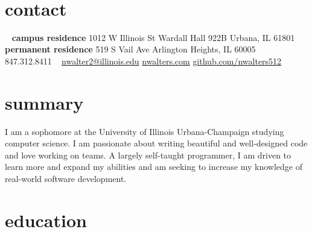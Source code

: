 \documentclass[nofooter]{resume}
\begin{document}


\begin{aside} %
~\vspace{-0.42cm} %
\section{contact}
\vspace{-0.16cm} %
~
\textbf{campus residence}
1012 W Illinois St
Wardall Hall 922B
Urbana, IL
61801
~
\textbf{permanent residence}
519 S Vail Ave
Arlington Heights, IL
60005
~
847.312.8411
~
\href{mailto:nwalter2@illinois.edu}{nwalter2@illinois.edu}
\href{http://www.nwalters.com}{nwalters.com}
\href{http://github.com/nwalters512}{github.com/nwalters512}
\end{aside}


\section{summary}

I am a sophomore at the University of Illinois Urbana-Champaign studying computer science.  I am passionate about writing beautiful and well-designed code and love working on teams.  A largely self-taught programmer, I am driven to learn more and expand my abilities and am seeking to increase my knowledge of real-world software development.


\section{education}
\end{document}
